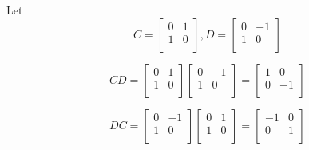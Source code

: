 \documentclass[12pt,letterpaper]{article}
\begin{document}
\begin{enumerate}
\begin{enumerate}
\begin{enumerate}[label=(\alph*)]
              Let
              \[
                C
                =
                \begin{bmatrix}
                  0 & 1 \\
                  1 & 0 \\
                \end{bmatrix}
                ,
                D
                =
                \begin{bmatrix}
                  0 & -1 \\
                  1 & 0 \\
                \end{bmatrix}
              \]

              \[
                CD
                =
                \begin{bmatrix}
                  0 & 1 \\
                  1 & 0 \\
                \end{bmatrix}
                \begin{bmatrix}
                  0 & -1 \\
                  1 & 0 \\
                \end{bmatrix}
                =
                \begin{bmatrix}
                  1 & 0 \\
                  0 & -1 \\
                \end{bmatrix}
              \]

              \[
                DC
                =
                \begin{bmatrix}
                  0 & -1 \\
                  1 & 0 \\
                \end{bmatrix}
                \begin{bmatrix}
                  0 & 1 \\
                  1 & 0 \\
                \end{bmatrix}
                =
                \begin{bmatrix}
                  -1 & 0 \\
                  0  & 1 \\
                \end{bmatrix}
              \]


\end{enumerate}
\end{enumerate}
\end{enumerate}
\end{document}
